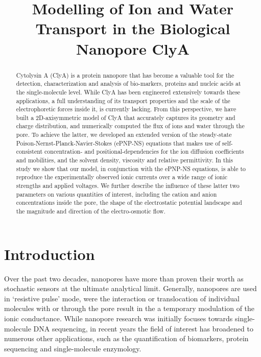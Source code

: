 \documentclass[journal=ancac3,manuscript=article,etalmode=truncate,maxauthors=0,layout=twocolumn]{achemso}
\title{Modelling of Ion and Water Transport in the Biological Nanopore ClyA}
\begin{document}

\begin{abstract}
\footnotesize
Cytolysin A (ClyA) is a protein nanopore that has become a valuable tool for the detection, characterization 
and analysis of bio-markers, proteins and nucleic acids at the single-molecule level.  While ClyA has been 
engineered extensively towards these applications, a full understanding of its transport properties and the 
scale of the electrophoretic forces inside it, is currently lacking. From this perspective, we have built a 
2D-axisymmetric model of ClyA that accurately captures its geometry and charge distribution, and numerically 
computed the flux of ions and water through the pore. To achieve the latter, we developed an extended version 
of the steady-state Poison-Nernst-Planck-Navier-Stokes (ePNP-NS) equations that makes use of self-consistent 
concentration- and positional-dependencies for the ion diffusion coefficients and mobilities, and the solvent 
density, viscosity and relative permittivity. In this study we show that our model, in conjunction with the 
ePNP-NS equations, is able to reproduce the experimentally observed ionic currents over a wide range of ionic 
strengths and applied voltages. We further describe the influence of these latter two parameters on various 
quantities of interest, including the cation and anion concentrations inside the pore, the shape of the 
electrostatic potential landscape and the magnitude and direction of the electro-osmotic flow.
\end{abstract}

\section{Introduction}

Over the past two decades, nanopores have more than proven their worth as stochastic sensors at the ultimate 
analytical limit.\cite{Bayley-2001,Zhang-2016} Generally, nanopores are used in `resistive pulse' mode, were 
the interaction or translocation of individual molecules with or through the pore result in the a temporary 
modulation of the ionic conductance. While nanopore research was initially focuses towards single-molecule 
DNA sequencing, in recent years the field of interest has broadened to numerous other applications, such as 
the quantification of biomarkers,\cite{Huang-2017} protein sequencing\cite{Restrepo-Perez-2018} and 
single-molecule enzymology.\cite{Willems-VanMeervelt-2017,Laszlo-2017}
\end{document}
